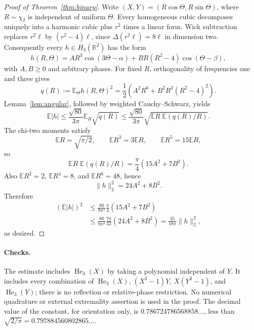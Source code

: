 \documentclass[11pt]{article}
\newcommand{\E}{\mathbb E}
\newcommand{\He}{\operatorname{He}}
\begin{document}
\begin{proof}[Proof of Theorem~\ref{thm:binary}]
Write $(X,Y)=(R\cos\Theta,R\sin\Theta)$, where $R\sim\chi_2$ is independent
of uniform $\Theta$. Every homogeneous cubic decomposes uniquely into a
harmonic cubic plus $r^2$ times a linear form. Wick subtraction replaces
$r^2\ell$ by $(r^2-4)\ell$, since $\Delta(r^2\ell)=8\ell$ in dimension two.
Consequently every $h\in H_3(\mathbb R^2)$ has the form
\[
 h(R,\Theta)=A R^3\cos(3\Theta-\alpha)
       +B R(R^2-4)\cos(\Theta-\beta),
\]
with $A,B\geq0$ and arbitrary phases. For fixed $R$, orthogonality of
frequencies one and three gives
\[
 q(R):=\E_\Theta h(R,\Theta)^2
 =\frac12\left(A^2R^6+B^2R^2(R^2-4)^2\right).
\]
Lemma~\ref{lem:angular}, followed by weighted Cauchy--Schwarz, yields
\[
 \E|h|\leq\frac{\sqrt{80}}{3\pi}\E_R\sqrt{q(R)}
 \leq\frac{\sqrt{80}}{3\pi}
       \sqrt{\E R\;\E(q(R)/R)}.
\]
The chi-two moments satisfy
\[
 \E R=\sqrt{\pi/2},\qquad
 \E R^3=3\E R,\qquad \E R^5=15\E R,
\]
so
\[
 \E R\;\E(q(R)/R)=\frac\pi4(15A^2+7B^2).
\]
Also $\E R^2=2$, $\E R^4=8$, and $\E R^6=48$, hence
\[
 \|h\|_2^2=24A^2+8B^2.
\]
Therefore
\begin{align*}
 (\E|h|)^2
 &\leq\frac{80}{9\pi^2}\frac\pi4(15A^2+7B^2)\\
 &\leq\frac{80}{9\pi^2}\frac{7\pi}{32}(24A^2+8B^2)
 =\frac{35}{18\pi}\|h\|_2^2,
\end{align*}
as desired.
\end{proof}

\paragraph{Checks.}
The estimate includes $\He_3(X)$ by taking a polynomial independent of $Y$.
It includes every combination of
$\He_3(X)$, $(X^2-1)Y$, $X(Y^2-1)$, and $\He_3(Y)$; there is no reflection
or relative-phase restriction. No numerical quadrature or external
extremality assertion is used in the proof. The decimal value of the
constant, for orientation only, is $0.786724786568858\ldots$, less than
$\sqrt{2/\pi}=0.797884560802865\ldots$.
\end{document}
